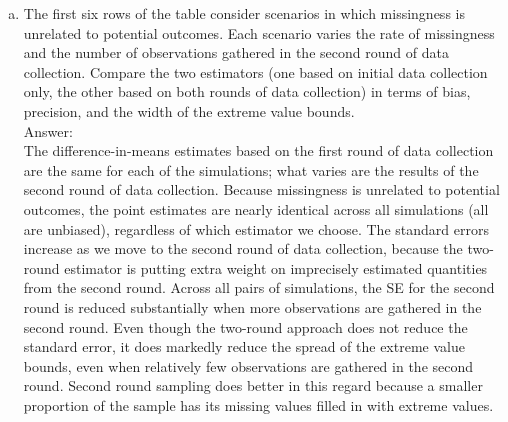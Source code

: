 \documentclass[11pt,notitlepage]{article}\usepackage[]{graphicx}\usepackage[]{color}
\begin{document}
\begin{enumerate}[a)]
\item The first six rows of the table consider scenarios in which missingness is unrelated to potential outcomes. Each scenario varies the rate of missingness and the number of observations gathered in the second round of data collection. Compare the two estimators (one based on initial data collection only, the other based on both rounds of data collection) in terms of bias, precision, and the width of the extreme value bounds.\\
Answer:\\
The difference-in-means estimates based on the first round of data collection are the same for each of the simulations; what varies are the results of the second round of data collection.  Because missingness is unrelated to potential outcomes, the point estimates are nearly identical across all simulations (all are unbiased), regardless of which estimator we choose.  The standard errors increase as we move to the second round of data collection, because the two-round estimator is putting extra weight on imprecisely estimated quantities from the second round.  Across all pairs of simulations, the SE for the second round is reduced substantially when more observations are gathered in the second round.  Even though the two-round approach does not reduce the standard error, it does markedly reduce the spread of the extreme value bounds, even when relatively few observations are gathered in the second round.  Second round sampling does better in this regard because a smaller proportion of the sample has its missing values filled in with extreme values. 


\end{enumerate}
\end{document}
